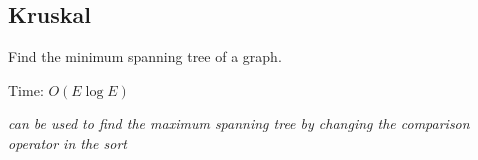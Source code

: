 \subsection{Kruskal}
Find the minimum spanning tree of a graph.

Time: $O(E \log E)$

\emph{\footnotesize can be used to find the maximum spanning tree by changing the comparison operator in the sort}
